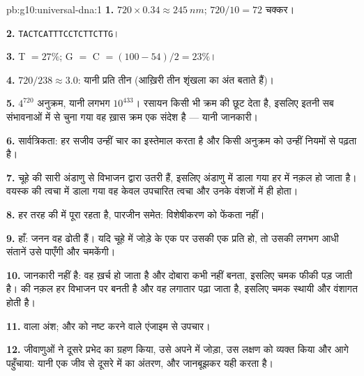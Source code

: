 \begin{solution}{pb:g10:universal-dna:1}
\textbf{1.} $720 \times 0.34 \approx \qty{245}{nm}$; $720/10 = 72$
चक्कर।

\textbf{2.} \texttt{TACTCATTTCCTCTTCTTG}।

\textbf{3.} T $= 27\%$; G $=$ C $= (100 - 54)/2 = 23\%$।

\textbf{4.} $720/238 \approx 3.0$: यानी प्रति  तीन 
(आख़िरी तीन शृंखला का अंत बताते हैं)।

\textbf{5.} $4^{720}$ अनुक्रम, यानी लगभग $10^{433}$। रसायन किसी भी क्रम
की छूट देता है, इसलिए इतनी सब संभावनाओं में से चुना गया वह ख़ास क्रम एक
संदेश है --- यानी जानकारी।

\textbf{6.} सार्वत्रिकता: हर सजीव उन्हीं चार  का
इस्तेमाल करता है और किसी अनुक्रम को उन्हीं नियमों से पढ़ता है।

\textbf{7.} चूहे की सारी  अंडाणु से विभाजन द्वारा उतरी हैं,
इसलिए अंडाणु में डाला गया  हर  में नक़ल हो जाता है। वयस्क की
त्वचा में डाला गया वह केवल उपचारित त्वचा  और उनके वंशजों में ही
होता।

\textbf{8.} हर तरह की  में पूरा  रहता है, पारजीन समेत:
विशेषीकरण  को फेंकता नहीं।

\textbf{9.} हाँ: जनन  वह  ढोती हैं। यदि चूहे में जोड़े के एक
 पर उसकी एक प्रति हो, तो उसकी लगभग आधी संतानें उसे पाएँगी और
चमकेंगी।

\textbf{10.}  जानकारी नहीं है: वह ख़र्च हो जाता है और दोबारा कभी
नहीं बनता, इसलिए चमक फीकी पड़ जाती है।  की नक़ल हर विभाजन पर बनती है
और वह लगातार पढ़ा जाता है, इसलिए चमक स्थायी और वंशागत होती है।

\textbf{11.}  वाला अंश; और  को नष्ट करने वाले एंजाइम से उपचार।

\textbf{12.} जीवाणुओं ने दूसरे प्रभेद का  ग्रहण किया, उसे अपने में
जोड़ा, उस लक्षण को व्यक्त किया और आगे पहुँचाया: यानी एक जीव से दूसरे में
 का अंतरण, और  जानबूझकर यही करता है।


\end{solution}
